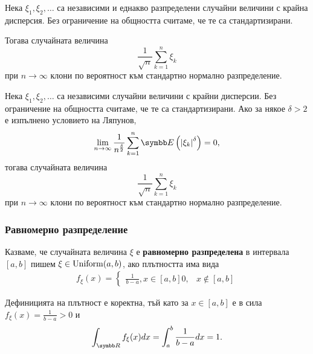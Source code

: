 \documentclass[
  headings=standardclasses,
  bibliography=totocnumbered,
]{scrartcl}
\begin{document}
\begin{theorem}
  Нека \( \xi_1, \xi_2, \ldots \) са независими и еднакво разпределени случайни величини с крайна дисперсия. Без ограничение на общността считаме, че те са стандартизирани.

  Тогава случайната величина
  \begin{equation*}
    \frac 1 {\sqrt n} \sum_{k=1}^n \xi_k
  \end{equation*}
  при \( n \to \infty \) клони по вероятност към стандартно нормално разпределение.
\end{theorem}

\begin{theorem}
  Нека \( \xi_1, \xi_2, \ldots \) са независими случайни величини с крайни дисперсии. Без ограничение на общността считаме, че те са стандартизирани.
  Ако за някое \( \delta > 2 \) е изпълнено условието на Ляпунов,
  \begin{equation*}
    \lim_{n \to \infty} \frac 1 {n^{\frac \delta 2}} \sum_{k=1}^n \Expect \left( {\Abs{\xi_k}}^\delta \right) = 0,
  \end{equation*}
  тогава случайната величина
  \begin{equation*}
    \frac 1 {\sqrt n} \sum_{k=1}^n \xi_k
  \end{equation*}
  при \( n \to \infty \) клони по вероятност към стандартно нормално разпределение.
\end{theorem}

\subsubsection{Равномерно разпределение}\label{sec:unif}

\begin{definition}
  Казваме, че случайната величина \( \xi \) е \textbf{равномерно разпределена} в интервала \( [a, b] \) пишем \( \xi \in \operatorname{Uniform}(a, b) \), ако плътността има вида
  \begin{align*}
    f_\xi(x)
    =
    \begin{cases}
      \frac 1 {b-a}, x \in [a, b]
      0, & x \not\in [a, b]
    \end{cases}
  \end{align*}

  Дефиницията на плътност е коректна, тъй като за \( x \in [a, b] \) е в сила \( f_\xi(x) = \frac 1 {b-a} > 0 \) и
  \begin{equation*}
    \int_{\R} f_\xi(x) dx
    =
    \int_a^b \frac 1 {b-a} dx
    =
    1.
  \end{equation*}
\end{definition}
\end{document}
